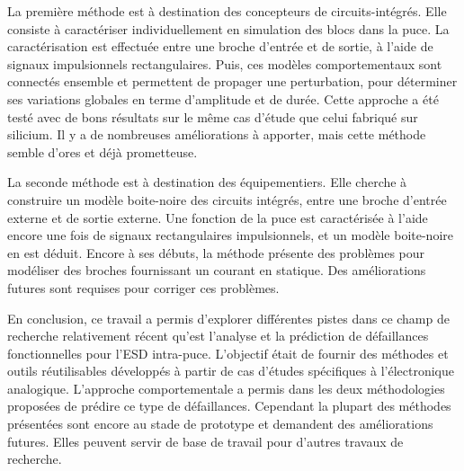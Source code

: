 La première méthode est à destination des concepteurs de circuits-intégrés.
Elle consiste à caractériser individuellement en simulation des blocs dans la puce.
La caractérisation est effectuée entre une broche d'entrée et de sortie, à l'aide de signaux impulsionnels rectangulaires.
Puis, ces modèles comportementaux sont connectés ensemble et permettent de propager une perturbation, pour déterminer ses variations globales en terme d'amplitude et de durée.
Cette approche a été testé avec de bons résultats sur le même cas d'étude que celui fabriqué sur silicium.
Il y a de nombreuses améliorations à apporter, mais cette méthode semble d'ores et déjà prometteuse.

La seconde méthode est à destination des équipementiers.
Elle cherche à construire un modèle boite-noire des circuits intégrés, entre une broche d'entrée externe et de sortie externe.
Une fonction de la puce est caractérisée à l'aide encore une fois de signaux rectangulaires impulsionnels, et un modèle boite-noire en est déduit.
Encore à ses débuts, la méthode présente des problèmes pour modéliser des broches fournissant un courant en statique.
Des améliorations futures sont requises pour corriger ces problèmes.

En conclusion, ce travail a permis d'explorer différentes pistes dans ce champ de recherche relativement récent qu'est l'analyse et la prédiction de défaillances fonctionnelles pour l'ESD intra-puce.
L'objectif était de fournir des méthodes et outils réutilisables développés à partir de cas d'études spécifiques à l’électronique analogique.
L'approche comportementale a permis dans les deux méthodologies proposées de prédire ce type de défaillances.
Cependant la plupart des méthodes présentées sont encore au stade de prototype et demandent des améliorations futures.
Elles peuvent servir de base de travail pour d'autres travaux de recherche.
